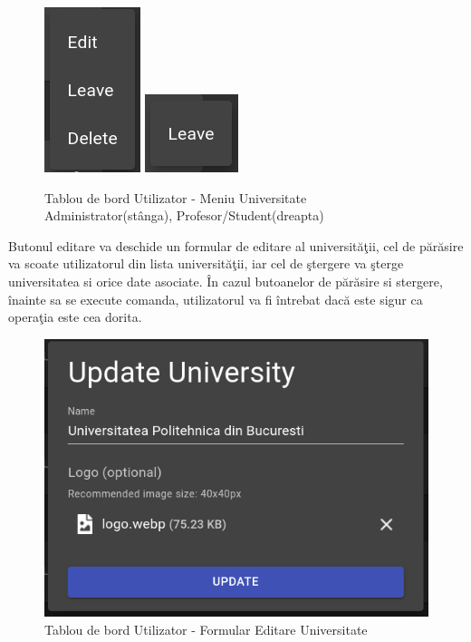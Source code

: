 \documentclass[12pt, a4paper, oneside, romanian]{teza-upb}
\begin{document}
\begin{figure}[H]
\centering
\includegraphics*[width=0.15\columnwidth]{tablou-de-bord-utilizator-meniu-universitate-administrator}
\includegraphics*[width=0.15\columnwidth]{tablou-de-bord-utilizator-meniu-universitate-profesor-student}
\caption{Tablou de bord Utilizator - Meniu Universitate Administrator(stânga), Profesor/Student(dreapta)}
\label{tablou-de-bord-utilizator-meniu-universitate}
\end{figure}

Butonul editare va deschide un formular de editare al universităţii, cel de părăsire va scoate utilizatorul din lista universităţii, iar cel de ştergere va şterge universitatea si orice date asociate. În cazul butoanelor de părăsire si stergere, înainte sa se execute comanda, utilizatorul va fi întrebat dacă este sigur ca operaţia este cea dorita.

\begin{figure}[H]
\centering
\includegraphics*[width=0.6\columnwidth]{tablou-de-bord-utilizator-formular-editare-universitate}
\caption{Tablou de bord Utilizator - Formular Editare Universitate}
\label{tablou-de-bord-utilizator-formular-editare-universitate}
\end{figure}
\end{document}
